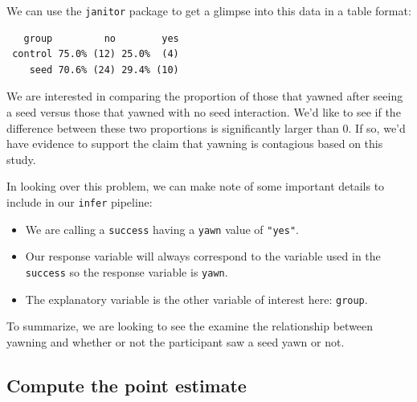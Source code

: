 \documentclass[12pt, krantz2,]{krantz}
\makeatletter
\newenvironment{Shaded}{\begin{snugshade}}{\end{snugshade}}
\newcommand{\CommentTok}[1]{\textcolor[rgb]{0.37,0.37,0.37}{\textit{#1}}}
\newcommand{\KeywordTok}[1]{\textcolor[rgb]{0.27,0.27,0.27}{\textbf{#1}}}
\newcommand{\NormalTok}[1]{#1}
\newcommand{\OperatorTok}[1]{\textcolor[rgb]{0.43,0.43,0.43}{\textbf{#1}}}
\newcommand{\StringTok}[1]{\textcolor[rgb]{0.5,0.5,0.5}{#1}}
\providecommand{\tightlist}{%
  \setlength{\itemsep}{0pt}\setlength{\parskip}{0pt}}
\newenvironment{kframe}{%
\medskip{}
\setlength{\fboxsep}{.8em}
 \def\at@end@of@kframe{}%
 \ifinner\ifhmode%
  \def\at@end@of@kframe{\end{minipage}}%
  \begin{minipage}{\columnwidth}%
 \fi\fi%
 \def\FrameCommand##1{\hskip\@totalleftmargin \hskip-\fboxsep
 \colorbox{shadecolor}{##1}\hskip-\fboxsep
     \hskip-\linewidth \hskip-\@totalleftmargin \hskip\columnwidth}%
 \MakeFramed {\advance\hsize-\width
   \@totalleftmargin\z@ \linewidth\hsize
   \@setminipage}}%
 {\par\unskip\endMakeFramed%
 \at@end@of@kframe}
\renewenvironment{Shaded}{\begin{kframe}}{\end{kframe}}
\makeatother
\begin{document}
We can use the \texttt{janitor} package to get a glimpse into this data in a table format:

\begin{Shaded}
\end{Shaded}

\begin{verbatim}
   group         no        yes
 control 75.0% (12) 25.0%  (4)
    seed 70.6% (24) 29.4% (10)
\end{verbatim}

We are interested in comparing the proportion of those that yawned after seeing a seed versus those that yawned with no seed interaction. We'd like to see if the difference between these two proportions is significantly larger than 0. If so, we'd have evidence to support the claim that yawning is contagious based on this study.

In looking over this problem, we can make note of some important details to include in our \texttt{infer} pipeline:

\begin{itemize}
\tightlist
\item
  We are calling a \texttt{success} having a \texttt{yawn} value of \texttt{"yes"}.
\item
  Our response variable will always correspond to the variable used in the \texttt{success} so the response variable is \texttt{yawn}.
\item
  The explanatory variable is the other variable of interest here: \texttt{group}.
\end{itemize}

To summarize, we are looking to see the examine the relationship between yawning and whether or not the participant saw a seed yawn or not.

\hypertarget{compute-the-point-estimate}{%
\subsection{Compute the point estimate}\label{compute-the-point-estimate}}
\end{document}
